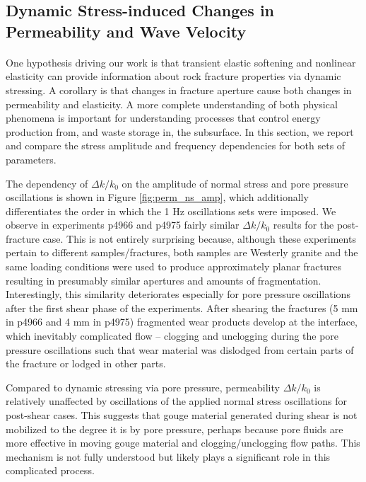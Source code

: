 \documentclass[letterpaper,10pt]{article}
\begin{document}
	\clearpage
	
	
	\subsection{Dynamic Stress-induced Changes in Permeability and Wave Velocity}
	\paragraph{}
	One hypothesis driving our work is that transient elastic softening and nonlinear elasticity can provide information about rock fracture properties via dynamic stressing. A corollary is that changes in fracture aperture cause both changes in permeability and elasticity. A more complete understanding of both physical phenomena is important for understanding processes that control energy production from, and waste storage in, the subsurface. In this section, we report and compare the stress amplitude and frequency dependencies for both sets of parameters. 
	
	The dependency of $ \Delta k/k_0 $ on the amplitude of normal stress and pore pressure oscillations is shown in Figure \ref{fig:perm_ns_amp}, which additionally differentiates the order in which the 1 Hz oscillations sets were imposed. We observe in experiments p4966 and p4975 fairly similar $ \Delta k/k_0 $ results for the post-fracture case. This is not entirely surprising because, although these experiments pertain to different samples/fractures, both samples are Westerly granite and the same loading conditions were used to produce approximately planar fractures resulting in presumably similar apertures and amounts of fragmentation. Interestingly, this similarity deteriorates especially for pore pressure oscillations after the first shear phase of the experiments. After shearing the fractures (5 mm in p4966 and 4 mm in p4975) fragmented wear products develop at the interface, which inevitably complicated flow -- clogging and unclogging during the pore pressure oscillations such that wear material was dislodged from certain parts of the fracture or lodged in other parts.
	
	Compared to dynamic stressing via pore pressure, permeability $ \Delta k/k_0 $ is relatively unaffected by oscillations of the applied normal stress oscillations for post-shear cases. This suggests that gouge material generated during shear is not mobilized to the degree it is by pore pressure, perhaps because pore fluids are more effective in moving gouge material and clogging/unclogging flow paths. This mechanism is not fully understood but likely plays a significant role in this complicated process.
	
\end{document}
